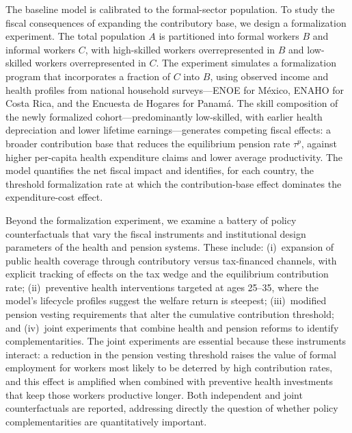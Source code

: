 \documentclass[12pt,a4paper]{article}
\begin{document}
The baseline model is calibrated to the formal-sector population. To study the fiscal consequences of expanding the contributory base, we design a formalization experiment. The total population $A$ is partitioned into formal workers $B$ and informal workers $C$, with high-skilled workers overrepresented in $B$ and low-skilled workers overrepresented in $C$. The experiment simulates a formalization program that incorporates a fraction of $C$ into $B$, using observed income and health profiles from national household surveys---ENOE for M\'exico, ENAHO for Costa Rica, and the Encuesta de Hogares for Panam\'a. The skill composition of the newly formalized cohort---predominantly low-skilled, with earlier health depreciation and lower lifetime earnings---generates competing fiscal effects: a broader contribution base that reduces the equilibrium pension rate $\tau^p$, against higher per-capita health expenditure claims and lower average productivity. The model quantifies the net fiscal impact and identifies, for each country, the threshold formalization rate at which the contribution-base effect dominates the expenditure-cost effect.

Beyond the formalization experiment, we examine a battery of policy counterfactuals that vary the fiscal instruments and institutional design parameters of the health and pension systems. These include: (i)~expansion of public health coverage through contributory versus tax-financed channels, with explicit tracking of effects on the tax wedge and the equilibrium contribution rate; (ii)~preventive health interventions targeted at ages 25--35, where the model's lifecycle profiles suggest the welfare return is steepest; (iii)~modified pension vesting requirements that alter the cumulative contribution threshold; and (iv)~joint experiments that combine health and pension reforms to identify complementarities. The joint experiments are essential because these instruments interact: a reduction in the pension vesting threshold raises the value of formal employment for workers most likely to be deterred by high contribution rates, and this effect is amplified when combined with preventive health investments that keep those workers productive longer. Both independent and joint counterfactuals are reported, addressing directly the question of whether policy complementarities are quantitatively important.
\end{document}
